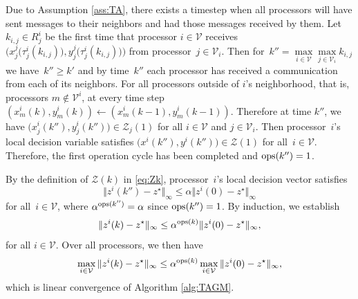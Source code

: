 \documentclass[9pt,shortpaper,twoside,web]{ieeecolor}
\newcommand{\Z}{\ensuremath{\mathcal{Z}}\xspace}
\newcommand{\V}{\ensuremath{\mathcal{V}}\xspace}
\newcommand{\ops}[1]{\textnormal{ops}(#1)}
\newcommand{\blue}[1]{{\textcolor{blue}{#1}}}
\begin{document}
    Due to Assumption \ref{ass:TA}, there exists a timestep when 
    all processors will have sent messages to their neighbors and had those messages received by them. 
    Let $k_{i,j}\in R^i_j$ be the first time that processor $i\in\V$ receives $\big(x^j_j\big(\tau^i_j(k_{i,j})\big),y^j_j\big(\tau^i_j(k_{i,j})\big)\big)$ from processor~$j \in \V_i$.
    Then for~$k''=\max\limits_{i\in\V}\max\limits_{j\in\V_i} k_{i,j}$ 
    we have~$k'' \geq k'$ and
    by time~$k''$ each processor has received a communication from each of its neighbors. 
    For all processors outside of $i$'s neighborhood, that is, processors $m\not\in\V^i$, at every time step $(x^i_m(k),y^i_m(k))\gets (x^i_m(k-1),y^i_m(k-1)).$
    Therefore at time $k''$, we have $\big(x^i_j(k''),y^i_j(k'')\big)\in\Z_j(1)$ for all $i\in\V$ and $j\in\V_i$.
    Then processor~$i$'s local decision variable satisfies $\big(x^i(k''),y^i(k'')\big)\in\Z(1)$
    for all~$i \in \V$.
    Therefore, the first operation cycle has been completed and $\ops{k''}=1$.

    By the definition of $\Z(k)$ in \eqref{eq:Zk}, processor~$i$'s local 
    decision vector satisfies 
    \begin{equation}
        \Vert z^i(k'')-z^\star\Vert_\infty\leq \alpha\Vert z^i(0)-z^\star\Vert_\infty
    \end{equation}
    for all~$i \in \V$, where $\alpha^{\ops{k''}}=\alpha$ since $\ops{k''}=1$.
    By induction, we establish %
    \begin{equation}
        \Vert z^i(k)-z^\star\Vert_\infty\leq \alpha^{\ops{k}}\Vert z^i(0)-z^\star\Vert_\infty,
    \end{equation}
    for all $i\in\V$.
    Over all processors, we then have
    \begin{equation}
        \max_{i\in\V}\Vert z^i(k)-z^\star\Vert_\infty \leq \alpha^{\ops{k}}\max_{i\in\V}\Vert z^i(0)-z^\star\Vert_\infty,
    \end{equation}
    which is linear convergence of Algorithm \ref{alg:TAGM}.
\end{document}
